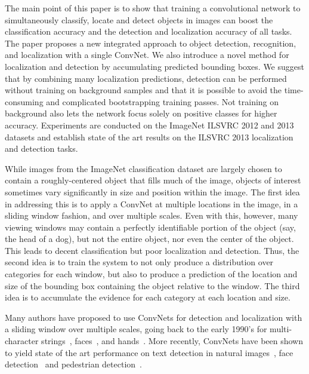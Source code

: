 \documentclass{article} %
\begin{document}
The main point of this paper is to show that training a convolutional network
to simultaneously classify, locate and detect objects in images can boost
the classification accuracy and the detection and localization
accuracy of all tasks. The paper proposes a new integrated approach to object
detection, recognition, and localization with a single
ConvNet. We also introduce a novel method for localization and detection
by accumulating predicted bounding boxes.
We suggest that by combining many localization predictions,
detection can be performed without training on background samples
and that it is possible to avoid the time-consuming and complicated
bootstrapping training passes. Not training on background also
lets the network focus solely on positive classes for higher accuracy.
Experiments are conducted on the ImageNet ILSVRC 2012 and 2013 datasets
and establish state of the art results on the ILSVRC 2013 localization
and detection tasks.

While images from the ImageNet classification dataset are largely chosen to contain a
roughly-centered object that fills much of the image, objects of
interest sometimes vary significantly in size and position within the
image. The first idea in addressing this is to apply a ConvNet at multiple locations in the
image, in a sliding window fashion, and over multiple scales. Even with
this, however, many viewing windows may contain a
perfectly identifiable portion of the object (say, the head of a dog),
but not the entire object, nor even the center of the object. This leads
to decent classification but poor localization and detection.
Thus, the second idea is to train the system to not only produce a
distribution over categories for each window, but also to produce a
prediction of the location and size of the bounding box containing the
object relative to the window. The third idea is to
accumulate the evidence for each category at each location and size.

Many authors have proposed to use ConvNets for detection and
localization with a sliding window over multiple scales, going back to
the early 1990's for multi-character strings~\cite{matan-92},
faces~\cite{vaillant-monrocq-lecun-94}, and
hands~\cite{nowlan-platt-95}. More recently, ConvNets have been shown
to yield state of the art performance on text detection in natural
images~\cite{delakis-garcia-08}, face
detection~\cite{garcia-delakis-04,osadchy-07} and pedestrian
detection~\cite{sermanet-cvpr-13}.
\end{document}
